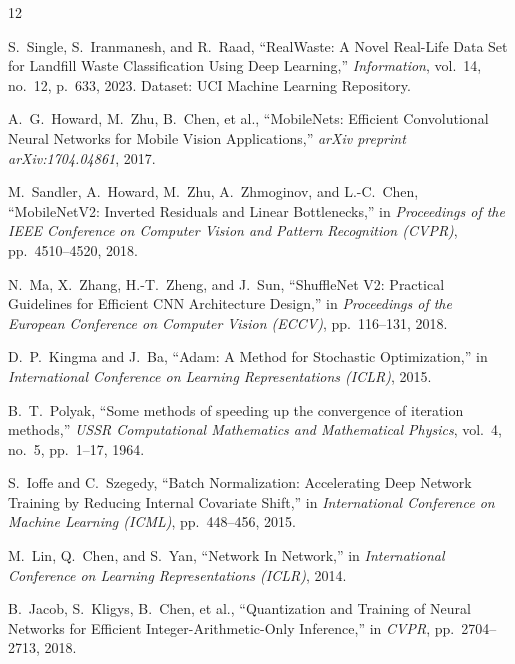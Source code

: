 \documentclass[11pt,a4paper]{article}
\begin{document}
\begin{thebibliography}{12}

S.~Single, S.~Iranmanesh, and R.~Raad,
\newblock ``RealWaste: A Novel Real-Life Data Set for Landfill Waste Classification Using Deep Learning,''
\newblock \emph{Information}, vol.~14, no.~12, p.~633, 2023. Dataset: UCI Machine Learning Repository.

A.~G.~Howard, M.~Zhu, B.~Chen, et al.,
\newblock ``MobileNets: Efficient Convolutional Neural Networks for Mobile Vision Applications,''
\newblock \emph{arXiv preprint arXiv:1704.04861}, 2017.

M.~Sandler, A.~Howard, M.~Zhu, A.~Zhmoginov, and L.-C.~Chen,
\newblock ``MobileNetV2: Inverted Residuals and Linear Bottlenecks,''
\newblock in \emph{Proceedings of the IEEE Conference on Computer Vision and Pattern Recognition (CVPR)}, pp.~4510--4520, 2018.

N.~Ma, X.~Zhang, H.-T.~Zheng, and J.~Sun,
\newblock ``ShuffleNet V2: Practical Guidelines for Efficient CNN Architecture Design,''
\newblock in \emph{Proceedings of the European Conference on Computer Vision (ECCV)}, pp.~116--131, 2018.

D.~P.~Kingma and J.~Ba,
\newblock ``Adam: A Method for Stochastic Optimization,''
\newblock in \emph{International Conference on Learning Representations (ICLR)}, 2015.

B.~T.~Polyak,
\newblock ``Some methods of speeding up the convergence of iteration methods,''
\newblock \emph{USSR Computational Mathematics and Mathematical Physics}, vol.~4, no.~5, pp.~1--17, 1964.

S.~Ioffe and C.~Szegedy,
\newblock ``Batch Normalization: Accelerating Deep Network Training by Reducing Internal Covariate Shift,''
\newblock in \emph{International Conference on Machine Learning (ICML)}, pp.~448--456, 2015.

M.~Lin, Q.~Chen, and S.~Yan,
\newblock ``Network In Network,''
\newblock in \emph{International Conference on Learning Representations (ICLR)}, 2014.

B.~Jacob, S.~Kligys, B.~Chen, et al.,
\newblock ``Quantization and Training of Neural Networks for Efficient Integer-Arithmetic-Only Inference,''
\newblock in \emph{CVPR}, pp.~2704--2713, 2018.


\end{thebibliography}
\end{document}
